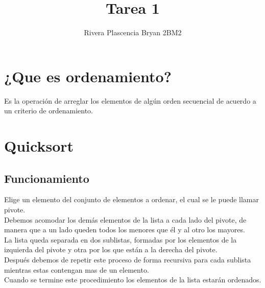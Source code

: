 \documentclass[]{article}
\title{Tarea 1}
\author{Rivera Plascencia Bryan 2BM2}
\begin{document}
\maketitle

\begin{abstract}

\end{abstract}
\newpage
\section{¿Que es ordenamiento?}
Es la operación de arreglar los elementos de algún orden secuencial de acuerdo a un criterio de ordenamiento.

\section{Quicksort}

\subsection{Funcionamiento}
Elige un elemento del conjunto de elementos a ordenar, el cual se le puede llamar pivote.\\
Debemos acomodar los demás elementos de la lista a cada lado del pivote, de manera que a un lado queden todos los menores que él y al otro los mayores.\\
La lista queda separada en dos sublistas, formadas por los elementos de la izquierda del pivote y otra por los que están a la derecha del pivote.\\
Después debemos de repetir este proceso de forma recursiva para cada sublista mientras estas contengan mas de un elemento.\\
Cuando se termine este procedimiento los elementos de la lista estarán ordenados.\\
\end{document}
